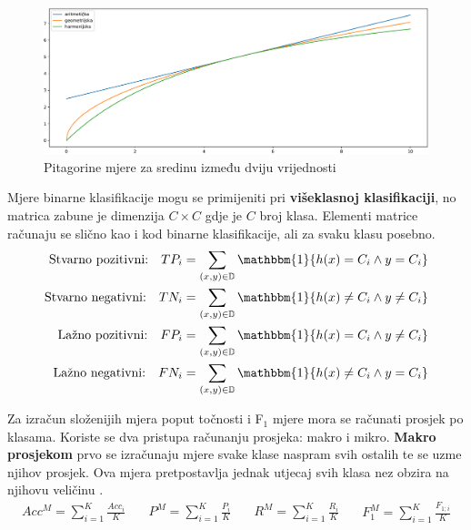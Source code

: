 \documentclass[times, utf8, numeric, diplomski]{fer}
\def\F1{F$_1$}
\begin{document}
\begin{figure}[h]
\includegraphics[width=\textwidth]{Pitagorine_sredine.pdf}
\centering
\caption{Pitagorine mjere za sredinu između dviju vrijednosti}
\label{fig:sredine}
\end{figure}

Mjere binarne klasifikacije mogu se primijeniti pri \textbf{višeklasnoj klasifikaciji}, no matrica zabune je dimenzija $C\times C$ gdje je $C$ broj klasa. Elementi matrice računaju se slično kao i kod binarne klasifikacije, ali za svaku klasu posebno.
\begin{align}
\label{eq:true_groups}
\begin{split}
\text{Stvarno pozitivni:} \quad TP_i &= \sum_{(x,y)\in\mathbb{D}} \mathbbm{1} \{h(x) =  C_i \wedge y = C_i \} \\
\text{Stvarno negativni:} \quad TN_i &= \sum_{(x,y)\in\mathbb{D}} \mathbbm{1} \{h(x) \neq C_i \wedge y \neq C_i \} \\
\text{Lažno pozitivni:} \quad FP_i &= \sum_{(x,y)\in\mathbb{D}} \mathbbm{1} \{h(x) = C_i \wedge y \neq C_i \} \\
\text{Lažno negativni:} \quad FN_i &= \sum_{(x,y)\in\mathbb{D}} \mathbbm{1} \{h(x) \neq C_i \wedge y = C_i \}
\end{split}
\end{align}

Za izračun složenijih mjera poput točnosti i \F1 mjere mora se računati prosjek po klasama. Koriste se dva pristupa računanju prosjeka: makro i mikro. \textbf{Makro prosjekom} prvo se izračunaju mjere svake klase naspram svih ostalih te se uzme njihov prosjek. Ova mjera pretpostavlja jednak utjecaj svih klasa nez obzira na njihovu veličinu \citep{ml_probabilistic}.
\begin{equation}
\begin{split}
Acc^M = \sum_{i=1}^K \frac{Acc_i}{K}
\end{split} \quad
\begin{split}
P^M = \sum_{i=1}^K \frac{P_i}{K}
\end{split} \quad
\begin{split}
R^M = \sum_{i=1}^K \frac{R_i}{K}
\end{split} \quad
\begin{split}
F_1^M = \sum_{i=1}^K \frac{F_{1;i}}{K}
\end{split}
\end{equation}
\end{document}
